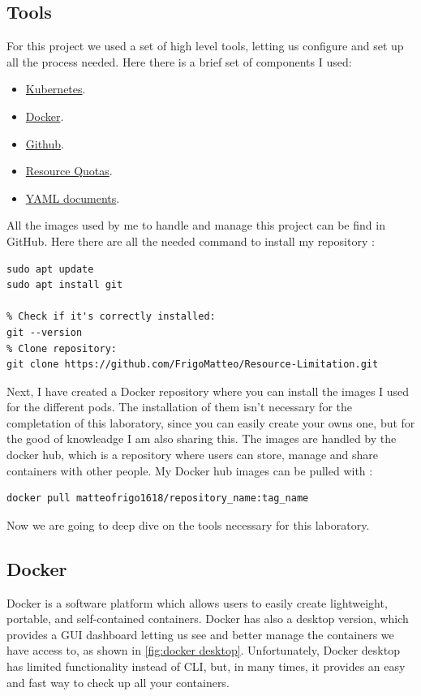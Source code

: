 \subsection{Tools}
For this project we used a set of high level tools, letting us configure and set up all the process needed. Here there is a brief set of components I used:
\begin{itemize}
    \item \hyperref[subsec:kubernetes]{Kubernetes}.
    \item \hyperref[subsec:Docker]{Docker}.
    \item \hyperref[github]{Github}.
    \item \hyperref[subsec:resource quotas]{Resource Quotas}.
    \item \hyperref[subsec:YAML]{YAML documents}.
\end{itemize}
\label{github}All the images used by me to handle and manage this project can be find in GitHub. Here there are all the needed command to install my repository \cite{FrigoMatteo2025Github}:
\begin{lstlisting}
sudo apt update
sudo apt install git

% Check if it's correctly installed:
git --version
% Clone repository:
git clone https://github.com/FrigoMatteo/Resource-Limitation.git
\end{lstlisting}
Next, I have created a Docker repository where you can install the images I used for the different pods. The installation of them isn't necessary for the completation of this laboratory, since you can easily create your owns one, but for the good of knowleadge I am also sharing this. The images are handled by the docker hub, which is a repository where users can store, manage and share containers with other people. My Docker hub images can be pulled with \cite{FrigoMatteo2025DockerHub}:
\begin{lstlisting}[caption={Pull any image from my repository}]
docker pull matteofrigo1618/repository_name:tag_name
\end{lstlisting}
Now we are going to deep dive on the tools necessary for this laboratory.

\subsection{Docker}
\label{subsec:Docker}
Docker \cite{docker2020docker} is a software platform which allows users to easily create lightweight, portable, and self-contained containers. Docker has also a desktop version, which provides a GUI dashboard letting us see and better manage the containers we have access to, as shown in \autoref{fig:docker desktop}. Unfortunately, Docker desktop has limited functionality instead of CLI, but, in many times, it provides an easy and fast way to check up all your containers. 

